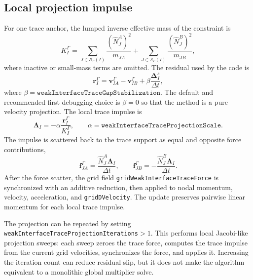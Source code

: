 \subsection{Local projection impulse}

For one trace anchor, the lumped inverse effective mass of the constraint is
\begin{equation}
  K_I^{\Gamma}
  =\sum_{J\in\mathcal{S}_\Gamma(I)}\frac{(\widehat N^A_J)^2}{m_{JA}}
  +\sum_{J\in\mathcal{S}_\Gamma(I)}\frac{(\widehat N^B_J)^2}{m_{JB}},
  \label{eq:weak-trace-effective-mass}
\end{equation}
where inactive or small-mass terms are omitted.  The residual used by the code is
\begin{equation}
  \mathbf{r}^{\Gamma}_I
  =\mathbf{v}^{\Gamma}_{IA}-\mathbf{v}^{\Gamma}_{IB}
   +\beta\frac{\boldsymbol{\Delta}^{s}_I}{\Delta t},
  \label{eq:weak-trace-residual}
\end{equation}
where $\beta=\texttt{weakInterfaceTraceGapStabilization}$.  The default and recommended first debugging choice is $\beta=0$ so that the method is a pure velocity projection.  The local trace impulse is
\begin{equation}
  \boldsymbol{\Lambda}_I
  =-\alpha\frac{\mathbf{r}^{\Gamma}_I}{K_I^{\Gamma}},
  \qquad
  \alpha=\texttt{weakInterfaceTraceProjectionScale}.
  \label{eq:weak-trace-impulse}
\end{equation}
The impulse is scattered back to the trace support as equal and opposite force contributions,
\begin{equation}
  \mathbf{f}^{\Gamma}_{JA}=\frac{\widehat N^A_J\boldsymbol{\Lambda}_I}{\Delta t},
  \qquad
  \mathbf{f}^{\Gamma}_{JB}=-\frac{\widehat N^B_J\boldsymbol{\Lambda}_I}{\Delta t}.
  \label{eq:weak-trace-force-scatter}
\end{equation}
After the force scatter, the grid field \texttt{gridWeakInterfaceTraceForce} is synchronized with an additive reduction, then applied to nodal momentum, velocity, acceleration, and \texttt{gridDVelocity}.  The update preserves pairwise linear momentum for each local trace impulse.

The projection can be repeated by setting \texttt{weakInterfaceTraceProjectionIterations}$>1$.  This performs local Jacobi-like projection sweeps: each sweep zeroes the trace force, computes the trace impulse from the current grid velocities, synchronizes the force, and applies it.  Increasing the iteration count can reduce residual slip, but it does not make the algorithm equivalent to a monolithic global multiplier solve.

